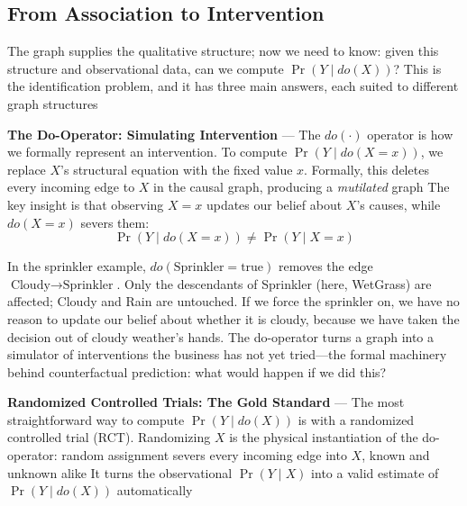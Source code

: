 \subsection{From Association to Intervention}
\label{subsec:from-association-to-intervention}

The graph supplies the qualitative structure; now we need to know: given this
structure and observational data, can we compute $\Pr(Y \mid do(X))$? This is
the identification problem, and it has three main answers, each suited to
different graph structures

\textbf{The Do-Operator: Simulating Intervention} --- The $do(\cdot)$ operator
is how we formally represent an intervention. To compute $\Pr(Y \mid do(X = x))$,
we replace $X$'s structural equation with the fixed value $x$. Formally, this
deletes every incoming edge to $X$ in the causal graph, producing a \emph{mutilated}
graph The key insight is that observing $X = x$ updates our belief about $X$'s
causes, while $do(X = x)$ severs them:
\begin{equation}
  \Pr(Y \mid do(X = x)) \neq \Pr(Y \mid X = x) \label{eq:do-vs-observe}
\end{equation}

In the sprinkler example, $do(\text{Sprinkler}= \text{true})$ removes the edge
$\text{Cloudy}\to \text{Sprinkler}$. Only the descendants of Sprinkler (here, WetGrass)
are affected; Cloudy and Rain are untouched. If we force the sprinkler on, we have
no reason to update our belief about whether it is cloudy, because we have taken
the decision out of cloudy weather's hands. The do-operator turns a graph into a
simulator of interventions the business has not yet tried—the formal machinery behind
counterfactual prediction: what would happen if we did this?


\textbf{Randomized Controlled Trials: The Gold Standard} --- The most
straightforward way to compute $\Pr(Y \mid do(X))$ is with a randomized
controlled trial (RCT). Randomizing $X$ is the physical instantiation of the do-operator:
random assignment severs every incoming edge into $X$, known and unknown alike It
turns the observational $\Pr(Y \mid X)$ into a valid estimate of $\Pr(Y \mid do(X
))$ automatically

